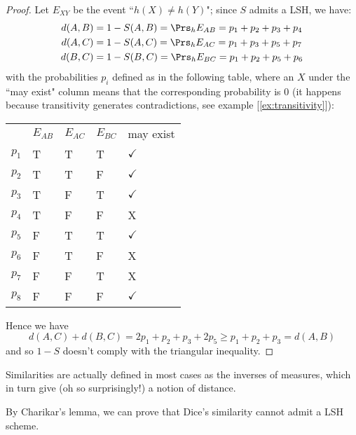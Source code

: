 \begin{proof}
	Let $E_{XY}$ be the event ``$h(X) \neq h(Y)$"; since $S$ admits a LSH, we have:
	\begin{align*}
		d(A,B) &= 1-S(A,B) = \Prs_h{E_{AB}} = p_1 + p_2 + p_3 + p_4 \\
		d(A,C) &= 1-S(A,C) = \Prs_h{E_{AC}} = p_1 + p_3 + p_5 + p_7 \\
		d(B,C) &= 1-S(B,C) = \Prs_h{E_{BC}} = p_1 + p_2 + p_5 + p_6
	\end{align*}
	with the probabilities $p_i$ defined as in the following table, where an $X$ under the ``may exist" column means that the corresponding probability is $0$ (it happens because transitivity generates contradictions, see example [\ref{ex:transitivity}]):

	\vspace{1ex}
	\begin{tabular}{lllll}
		& $E_{AB}$ & $E_{AC}$ & $E_{BC}$ & may exist             \\
		$p_1$ & T         & T         & T         & $\checkmark$ \\
		$p_2$ & T         & T         & F         & $\checkmark$ \\
		$p_3$ & T         & F         & T         & $\checkmark$ \\
		$p_4$ & T         & F         & F         & X            \\
		$p_5$ & F         & T         & T         & $\checkmark$ \\
		$p_6$ & F         & T         & F         & X            \\
		$p_7$ & F         & F         & T         & X            \\
		$p_8$ & F         & F         & F         & $\checkmark$
	\end{tabular}

	Hence we have
	\begin{equation*}
		d(A,C) + d(B,C) = 2p_1 + p_2 + p_3 + 2p_5 \geq p_1 + p_2 + p_3 = d(A,B)
	\end{equation*}
	and so $1-S$ doesn't comply with the triangular inequality.
\end{proof}

\obs Similarities are actually defined in most cases as the inverses of measures, which in turn give (oh so surprisingly!) a notion of distance.

\begin{cor}
	By Charikar's lemma, we can prove that Dice's similarity cannot admit a LSH scheme.
\end{cor}

